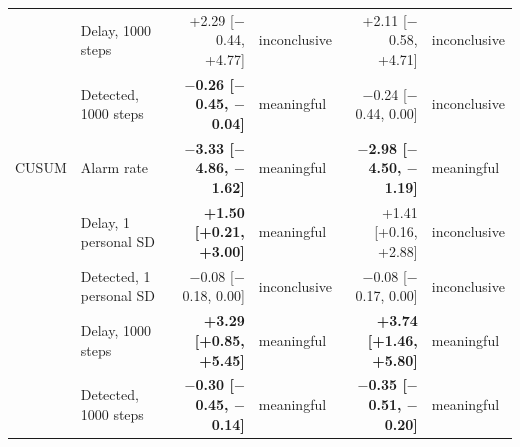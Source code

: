 \begin{table}[!htbp]
\begin{tabular}{@{}llrlrl@{}}
 & Delay, 1000 steps & +2.29 [$-$0.44, +4.77] & inconclusive & +2.11 [$-$0.58, +4.71] & inconclusive \\
 & Detected, 1000 steps & \textbf{$-$0.26 [$-$0.45, $-$0.04]} & meaningful & $-$0.24 [$-$0.44, 0.00] & inconclusive \\
\addlinespace
CUSUM & Alarm rate & \textbf{$-$3.33 [$-$4.86, $-$1.62]} & meaningful & \textbf{$-$2.98 [$-$4.50, $-$1.19]} & meaningful \\
 & Delay, 1 personal SD & \textbf{+1.50 [+0.21, +3.00]} & meaningful & +1.41 [+0.16, +2.88] & inconclusive \\
 & Detected, 1 personal SD & $-$0.08 [$-$0.18, 0.00] & inconclusive & $-$0.08 [$-$0.17, 0.00] & inconclusive \\
 & Delay, 1000 steps & \textbf{+3.29 [+0.85, +5.45]} & meaningful & \textbf{+3.74 [+1.46, +5.80]} & meaningful \\
 & Detected, 1000 steps & \textbf{$-$0.30 [$-$0.45, $-$0.14]} & meaningful & \textbf{$-$0.35 [$-$0.51, $-$0.20]} & meaningful \\
\bottomrule
\end{tabular}
\end{table}
